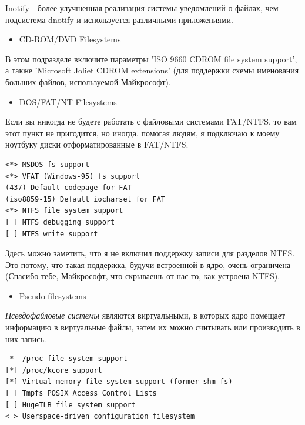 \documentclass[10pt]{book}
\begin{document}
Inotify - более улучшенная реализация системы уведомлений о файлах, чем подсистема dnotify и используется различными приложениями.

\begin{itemize}
\item CD-ROM/DVD Filesystems
\end{itemize}

В этом подразделе включите параметры 'ISO 9660 CDROM file system support', а также 'Microsoft Joliet CDROM extensions' (для поддержки схемы именования больших файлов, используемой Майкрософт).

\begin{itemize}
\item DOS/FAT/NT Filesystems
\end{itemize}

Если вы никогда не будете работать с файловыми системами FAT/NTFS, то вам этот пункт не пригодится, но иногда, помогая людям, я подключаю к моему ноутбуку диски отформатированные в FAT/NTFS.

\vspace{3mm}
\begin{tcolorbox}[colback=gray!14!white, colframe=blue!75!blue]
\begin{lstlisting}
<*> MSDOS fs support
<*> VFAT (Windows-95) fs support
(437) Default codepage for FAT
(iso8859-15) Default iocharset for FAT
<*> NTFS file system support
[ ] NTFS debugging support
[ ] NTFS write support
\end{lstlisting}
\end{tcolorbox}

Здесь можно заметить, что я не включил поддержку записи для разделов NTFS. Это потому, что такая поддержка, будучи встроенной в ядро, очень ограничена (Спасибо тебе, Майкрософт, что скрываешь от нас то, как устроена NTFS).

\begin{itemize}
\item Pseudo filesystems                    
\end{itemize}

\textit{Псевдофайловые системы} являются виртуальными, в которых ядро помещает информацию в виртуальные файлы, затем их можно считывать или производить в них запись.

\vspace{3mm}
\begin{tcolorbox}[colback=gray!14!white, colframe=blue!75!blue]
\begin{lstlisting}
-*- /proc file system support
[*] /proc/kcore support
[*] Virtual memory file system support (former shm fs)
[ ] Tmpfs POSIX Access Control Lists
[ ] HugeTLB file system support
< > Userspace-driven configuration filesystem
\end{lstlisting}
\end{tcolorbox}
\end{document}
